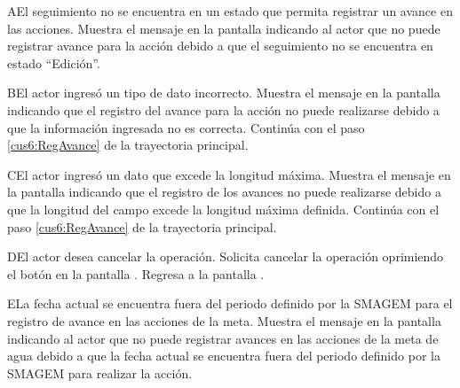 \begin{UCtrayectoriaA}{A}{El seguimiento no se encuentra en un estado que permita registrar un avance en las acciones.}
    \UCpaso[\UCsist] Muestra el mensaje  en la pantalla  indicando al actor que no puede registrar avance para la acción debido a que el seguimiento no se encuentra en estado ``Edición''. 
\end{UCtrayectoriaA}
 
    \begin{UCtrayectoriaA}{B}{El actor ingresó un tipo de dato incorrecto.}    
    \UCpaso[\UCsist] Muestra el mensaje  en la pantalla  indicando que el registro del avance para la acción no puede realizarse debido a que la información ingresada no es correcta.
    \UCpaso[] Continúa con el paso \ref{cus6:RegAvance} de la trayectoria principal.     
    \end{UCtrayectoriaA}
    
    \begin{UCtrayectoriaA}{C}{El actor ingresó un dato que excede la longitud máxima.}    
    \UCpaso[\UCsist] Muestra el mensaje  en la pantalla  indicando que el registro de los avances no puede realizarse debido a que la longitud del campo excede la longitud máxima definida.
    \UCpaso[] Continúa con el paso \ref{cus6:RegAvance} de la trayectoria principal.     
    \end{UCtrayectoriaA}
 
    \begin{UCtrayectoriaA}{D}{El actor desea cancelar la operación.}
      \UCpaso[\UCactor] Solicita cancelar la operación oprimiendo el botón  en la pantalla .
      \UCpaso[\UCsist] Regresa a la pantalla . 
    \end{UCtrayectoriaA}

    \begin{UCtrayectoriaA}{E}{La fecha actual se encuentra fuera del periodo definido por la SMAGEM para el registro de avance en las acciones de la meta.}
    \UCpaso[\UCsist] Muestra el mensaje  en la pantalla  indicando al actor que no puede registrar avances en las acciones de la meta de agua debido a que la fecha actual se encuentra fuera del periodo definido por la SMAGEM para realizar la acción. 
    \end{UCtrayectoriaA}